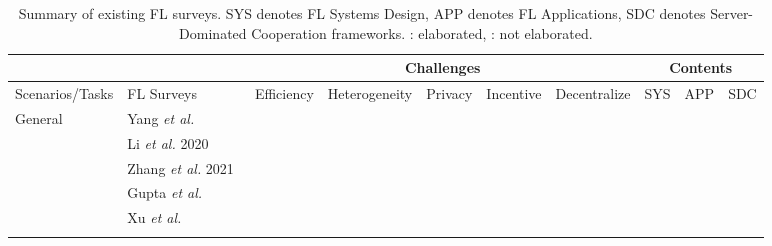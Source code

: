 \documentclass[journal]{IEEEtran}
\newcommand{\cmark}{\ding{51}}
\newcommand{\xmark}{\ding{55}}
\begin{document}
\begin{table}[t]
    \centering
    \footnotesize
    \caption{Summary of existing FL surveys. SYS denotes FL Systems Design, APP denotes FL Applications, SDC denotes Server-Dominated Cooperation frameworks.
    \cmark: elaborated, \xmark: not elaborated.}
    \label{table:surveys}
    \begin{tabular}{|l|l|lllll|lll|}
    \hline
                       & \multicolumn{1}{c|}{} & \multicolumn{5}{c|}{Challenges}                                                                            & \multicolumn{3}{c|}{Contents}                            \\ \hline
                       Scenarios/Tasks &           FL Surveys            & \multicolumn{1}{l|}{Efficiency} & \multicolumn{1}{l|}{Heterogeneity} & \multicolumn{1}{l|}{Privacy} & \multicolumn{1}{l|}{Incentive} & Decentralize & \multicolumn{1}{l|}{SYS} & \multicolumn{1}{l|}{APP} & SDC \\ \hline
    \multirow{14}{*}{General} &      Yang \textit{et al.}~\cite{yang2019federated}         & \multicolumn{1}{c|}{ \cmark } & \multicolumn{1}{c|}{\cmark} & \multicolumn{1}{c|}{\cmark} & \multicolumn{1}{c|}{\cmark} & \multicolumn{1}{c|}{\cmark}  & \multicolumn{1}{c|}{\cmark} & \multicolumn{1}{c|}{\cmark} & \multicolumn{1}{c|}{\cmark}  \\ \cline{2-10}              
                        &   Li \textit{et al.} 2020~\cite{li2020federated}                    & \multicolumn{1}{c|}{\cmark} & \multicolumn{1}{c|}{\cmark} & \multicolumn{1}{c|}{\cmark} & \multicolumn{1}{c|}{\xmark} & \multicolumn{1}{c|}{\cmark} & \multicolumn{1}{c|}{\cmark} & \multicolumn{1}{c|}{\cmark} & \multicolumn{1}{c|}{\cmark} \\ \cline{2-10} 
                        & Zhang \textit{et al.} 2021~\cite{zhang2021survey} & \multicolumn{1}{c|}{\cmark} & \multicolumn{1}{c|}{\cmark} & \multicolumn{1}{c|}{\cmark} & \multicolumn{1}{c|}{\xmark} & \multicolumn{1}{c|}{\xmark} & \multicolumn{1}{c|}{\cmark} & \multicolumn{1}{c|}{\cmark} & \multicolumn{1}{c|}{\cmark} \\ \cline{2-10} 
                       & Gupta \textit{et al.}~\cite{gupta2022survey} & \multicolumn{1}{c|}{\cmark} & \multicolumn{1}{c|}{\cmark} & \multicolumn{1}{c|}{\cmark} & \multicolumn{1}{c|}{\xmark} & \multicolumn{1}{c|}{\cmark} & \multicolumn{1}{c|}{\cmark} & \multicolumn{1}{c|}{\cmark} & \multicolumn{1}{c|}{\cmark} \\ \cline{2-10} 
                       & Xu \textit{et al.}~\cite{xu2023asynchronous}                    & \multicolumn{1}{c|}{\cmark} & \multicolumn{1}{c|}{\cmark} & \multicolumn{1}{c|}{\cmark} & \multicolumn{1}{c|}{\xmark} & \multicolumn{1}{c|}{\cmark} & \multicolumn{1}{c|}{\cmark} & \multicolumn{1}{c|}{\cmark} & \multicolumn{1}{c|}{\cmark} \\ \cline{2-10} 

\end{tabular}
\end{table}
\end{document}
